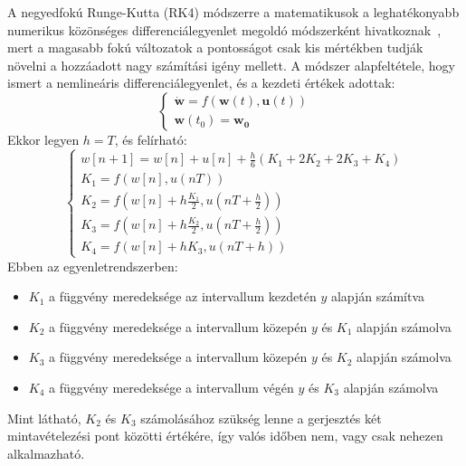 A negyedfokú Runge-Kutta (RK4) módszerre a matematikusok a leghatékonyabb numerikus közönséges differenciálegyenlet megoldó módszerként hivatkoznak~\cite{rk4}, mert a magasabb fokú változatok a pontosságot csak kis mértékben tudják növelni a hozzáadott nagy számítási igény mellett. A módszer alapfeltétele, hogy ismert a nemlineáris differenciálegyenlet, és a kezdeti értékek adottak:
\begin{equation}
    \begin{cases}
        \mathbf{\dot{w}}=f(\mathbf{w}(t), \mathbf{u}(t))\\
        \mathbf{w}(t_0)=\mathbf{w_0} 
    \end{cases}
\end{equation}
Ekkor legyen $h=T$, és felírható:
\begin{equation}
    \begin{cases}
        w[n+1]=w[n]+u[n]+\frac{h}{6}(K_1+2K_2+2K_3+K_4)\\
        K_1=f(w[n], u(nT))\\
        K_2=f(w[n]+h\frac{K_1}{2}, u(nT+\frac{h}{2}))\\
        K_3=f(w[n]+h\frac{K_2}{2}, u(nT+\frac{h}{2}))\\
        K_4=f(w[n]+hK_3, u(nT+h))
    \end{cases}
\end{equation}
Ebben az egyenletrendszerben:
\begin{itemize}
    \item $K_1$ a függvény meredeksége az intervallum kezdetén $y$ alapján számítva
    \item $K_2$ a függvény meredeksége a intervallum közepén $y$ és $K_1$ alapján számolva 
    \item $K_3$ a függvény meredeksége a intervallum közepén $y$ és $K_2$ alapján számolva
    \item $K_4$ a függvény meredeksége a intervallum végén $y$ és $K_3$ alapján számolva
\end{itemize}
Mint látható, $K_2$ és $K_3$ számolásához szükség lenne a gerjesztés két mintavételezési pont közötti értékére, így valós időben nem, vagy csak nehezen alkalmazható.
